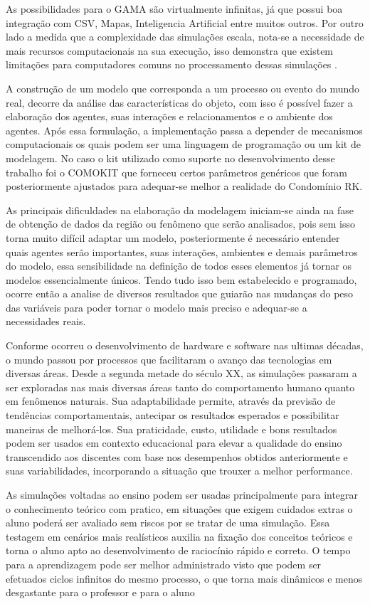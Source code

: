 As possibilidades para o GAMA são virtualmente infinitas, já que possui boa integração com CSV, Mapas, Inteligencia Artificial entre muitos outros. Por outro lado a medida que a complexidade das simulações escala, nota-se a necessidade de mais recursos computacionais na sua execução, isso demonstra que existem limitações para computadores comuns no processamento dessas simulações\cite{gamaplataform} .

A construção de um modelo que corresponda a um processo ou evento do mundo real, decorre da análise das características do objeto, com isso é possível fazer a elaboração dos agentes, suas interações e relacionamentos e o ambiente dos agentes. Após essa formulação, a implementação passa a depender de mecanismos computacionais os quais podem ser uma linguagem de programação ou um kit de modelagem\cite{macaltutorial:online}. No caso o kit utilizado como suporte no desenvolvimento desse trabalho foi o COMOKIT que forneceu certos parâmetros genéricos que foram posteriormente ajustados para adequar-se melhor a realidade do Condomínio RK.

As principais dificuldades na elaboração da modelagem iniciam-se ainda na fase de obtenção de dados da região ou fenômeno que serão analisados, pois sem isso torna muito difícil adaptar um modelo, posteriormente é necessário entender quais agentes serão importantes, suas interações, ambientes e demais parâmetros do modelo, essa sensibilidade na definição de todos esses elementos já tornar os modelos essencialmente únicos. Tendo tudo isso bem estabelecido e programado, ocorre então a analise de diversos resultados que guiarão nas mudanças do peso das variáveis para poder tornar o modelo mais preciso e adequar-se a necessidades reais.

Conforme ocorreu o desenvolvimento de hardware e software nas ultimas décadas, o mundo passou por processos que facilitaram o avanço das tecnologias em diversas áreas. Desde a segunda metade do século XX, as simulações passaram a ser exploradas nas mais diversas áreas tanto do comportamento humano quanto em fenômenos naturais. Sua adaptabilidade permite, através da previsão de tendências comportamentais, antecipar os resultados esperados e possibilitar maneiras de melhorá-los. Sua praticidade, custo, utilidade e bons resultados podem ser usados em contexto educacional para elevar a qualidade do ensino transcendido aos discentes com base nos desempenhos obtidos anteriormente e suas variabilidades, incorporando a situação que trouxer a melhor performance.

As simulações voltadas ao ensino podem ser usadas principalmente para integrar o conhecimento teórico com pratico, em situações que exigem cuidados extras o aluno poderá ser avaliado sem riscos por se tratar de uma simulação. Essa testagem em cenários mais realísticos auxilia na fixação dos conceitos teóricos e torna o aluno apto ao desenvolvimento de raciocínio rápido e correto. O tempo para a aprendizagem pode ser melhor administrado visto que podem ser efetuados ciclos infinitos do mesmo processo, o que torna mais dinâmicos e menos desgastante para o professor e para o aluno


